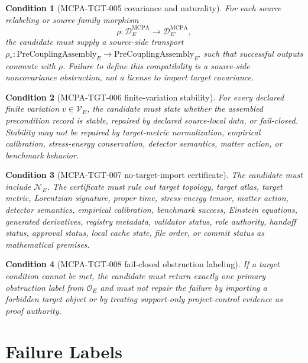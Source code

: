 \documentclass[11pt]{article}
\newcommand{\PreCoupAsm}{\mathrm{PreCouplingAssembly}}
\newtheorem{condition}{Condition}
\begin{document}
\begin{condition}[MCPA-TGT-005 covariance and naturality]
For each source relabeling or source-family morphism
\[
  \rho: \mathcal{D}^{\mathrm{MCPA}}_E \to
  \mathcal{D}^{\mathrm{MCPA}}_{E'},
\]
the candidate must supply a source-side transport
\(\rho_*:\PreCoupAsm_E\to \PreCoupAsm_{E'}\) such that successful outputs
commute with \(\rho\). Failure to define this compatibility is a source-side
noncovariance obstruction, not a license to import target covariance.
\end{condition}

\begin{condition}[MCPA-TGT-006 finite-variation stability]
For every declared finite variation \(v\in\mathcal{V}_E\), the candidate must
state whether the assembled precondition record is stable, repaired by
declared source-local data, or fail-closed. Stability may not be repaired by
target-metric normalization, empirical calibration, stress-energy
conservation, detector semantics, matter action, or benchmark behavior.
\end{condition}

\begin{condition}[MCPA-TGT-007 no-target-import certificate]
The candidate must include \(\mathcal{N}_E\). The certificate must rule out
target topology, target atlas, target metric, Lorentzian signature, proper
time, stress-energy tensor, matter action, detector semantics, empirical
calibration, benchmark success, Einstein equations, generated derivatives,
registry metadata, validator status, role authority, handoff status,
approval status, local cache state, file order, or commit status as
mathematical premises.
\end{condition}

\begin{condition}[MCPA-TGT-008 fail-closed obstruction labeling]
If a target condition cannot be met, the candidate must return exactly one
primary obstruction label from \(\mathcal{O}_E\) and must not repair the
failure by importing a forbidden target object or by treating support-only
project-control evidence as proof authority.
\end{condition}

\section{Failure Labels}
\end{document}
